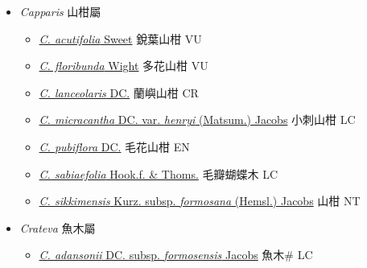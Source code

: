 
  \begin{itemize}
 \item[] \textit{Capparis} 山柑屬
                    
  \begin{itemize}
        \item[] \href{http://www.theplantlist.org/tpl1.1/search?q=Capparis+acutifolia}{\textit{C. acutifolia} Sweet}   銳葉山柑 VU
        \item[] \href{http://www.theplantlist.org/tpl1.1/search?q=Capparis+floribunda}{\textit{C. floribunda} Wight}   多花山柑 VU
        \item[] \href{http://www.theplantlist.org/tpl1.1/search?q=Capparis+lanceolaris}{\textit{C. lanceolaris} DC.}   蘭嶼山柑 CR
        \item[] \href{http://www.theplantlist.org/tpl1.1/search?q=Capparis+micracantha+var.+henryi}{\textit{C. micracantha} DC. var. \textit{henryi} (Matsum.) Jacobs}   小刺山柑 LC
        \item[] \href{http://www.theplantlist.org/tpl1.1/search?q=Capparis+pubiflora}{\textit{C. pubiflora} DC.}   毛花山柑 EN
        \item[] \href{http://www.theplantlist.org/tpl1.1/search?q=Capparis+sabiaefolia}{\textit{C. sabiaefolia} Hook.f. \& Thoms.}   毛瓣蝴蝶木 LC
        \item[] \href{http://www.theplantlist.org/tpl1.1/search?q=Capparis+sikkimensis+subsp.+formosana}{\textit{C. sikkimensis} Kurz. subsp. \textit{formosana} (Hemsl.) Jacobs}   山柑 NT
  \end{itemize}
 \item[] \textit{Crateva} 魚木屬
                    
  \begin{itemize}
        \item[] \href{http://www.theplantlist.org/tpl1.1/search?q=Crateva+adansonii+subsp.+formosensis}{\textit{C. adansonii} DC. subsp. \textit{formosensis} Jacobs}   魚木\# LC
  \end{itemize}
  \end{itemize}
